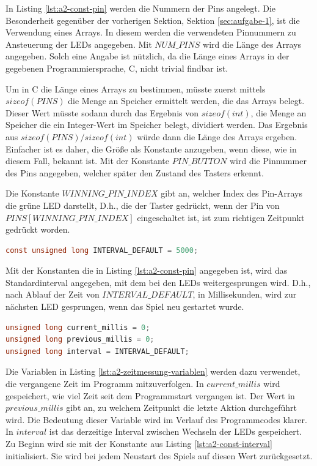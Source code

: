 In Listing \ref{lst:a2-const-pin} werden die Nummern der Pins angelegt.
Die Besonderheit gegenüber der vorherigen Sektion, Sektion \ref{sec:aufgabe-1}, ist die Verwendung eines Arrays.
In diesem werden die verwendeten Pinnummern zu Ansteuerung der LEDs angegeben.
Mit $NUM\_PINS$ wird die Länge des Arrays angegeben.
Solch eine Angabe ist nützlich, da die Länge eines Arrays in der gegebenen Programmiersprache, C, nicht trivial findbar ist.

Um in C die Länge eines Arrays zu bestimmen, müsste zuerst mittels $sizeof(PINS)$ die Menge an Speicher ermittelt werden, die das Arrays belegt.
Dieser Wert müsste sodann durch das Ergebnis von $sizeof(int)$, die Menge an Speicher die ein Integer-Wert im Speicher belegt, dividiert werden.
Das Ergebnis aus $sizeof(PINS) / sizeof(int)$ würde dann die Länge des Arrays ergeben.
Einfacher ist es daher, die Größe als Konstante anzugeben, wenn diese, wie in diesem Fall, bekannt ist.
Mit der Konstante $PIN\_BUTTON$ wird die Pinnummer des Pins angegeben, welcher später den Zustand des Tasters erkennt.

Die Konstante $WINNING\_PIN\_INDEX$ gibt an, welcher Index des Pin-Arrays die grüne LED darstellt,
D.h., die der Taster gedrückt, wenn der Pin von $PINS[WINNING\_PIN\_INDEX]$ eingeschaltet ist, ist zum richtigen Zeitpunkt gedrückt worden.

\begin{lstlisting}[language=C,label={lst:a2-const-interval}, caption={Standard Interval zum LED wechsel}]
const unsigned long INTERVAL_DEFAULT = 5000;
\end{lstlisting}

Mit der Konstanten die in Listing \ref{lst:a2-const-pin} angegeben ist, wird das Standardinterval angegeben, mit dem bei den LEDs weitergesprungen wird.
D.h., nach Ablauf der Zeit von $INTERVAL\_DEFAULT$, in Millisekunden, wird zur nächsten LED gesprungen, wenn das Spiel neu gestartet wurde.


\begin{lstlisting}[language=C,label={lst:a2-zeitmessung-variablen}, caption={Variablen zur Zeitmessung}]
unsigned long current_millis = 0;
unsigned long previous_millis = 0;
unsigned long interval = INTERVAL_DEFAULT;
\end{lstlisting}

Die Variablen in Listing \ref{lst:a2-zeitmessung-variablen} werden dazu verwendet, die vergangene Zeit im Programm mitzuverfolgen.
In $current\_millis$ wird gespeichert, wie viel Zeit seit dem Programmstart vergangen ist.
Der Wert in $previous\_millis$ gibt an, zu welchem Zeitpunkt die letzte Aktion durchgeführt wird.
Die Bedeutung dieser Variable wird im Verlauf des Programmcodes klarer.
In $interval$ ist das derzeitige Interval zwischen Wechseln der LEDs gespeichert.
Zu Beginn wird sie mit der Konstante aus Listing \ref{lst:a2-const-interval} initialisiert.
Sie wird bei jedem Neustart des Spiels auf diesen Wert zurückgesetzt.

